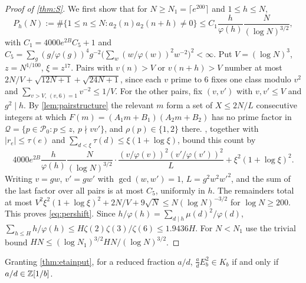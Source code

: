 \documentclass[11pt]{article}
\newcommand{\cnt}{\#}
\begin{document}
\begin{proof}[Proof of \cref{thm:S}]
We first show that for $N\ge N_1=\lceil e^{200}\rceil$ and $1\le h\le N$,
\begin{equation}\label{eq:pershift}
P_h(N):=\cnt\{1\le n\le N:a_2(n)a_2(n+h)\ne0\}\le C_1\frac h{\varphi(h)}\frac N{(\log N)^{3/2}},
\end{equation}
with $C_1=4000e^{2B}C_5+1$ and
$C_5=\sum_g(g/\varphi(g))^4g^{-2}\bigl(\sum_w(w/\varphi(w))^2w^{-2}\bigr)^2<\infty$. Put
$V=(\log N)^3$, $z=N^{1/100}$, $\xi=z^{17}$. Pairs with $v(n)>V$ or $v(n+h)>V$ number at most
$2N/V+\sqrt{12N+1}+\sqrt{24N+1}$, since each $v$ prime to $6$ fixes one class modulo $v^2$ and
$\sum_{v>V,\,(v,6)=1}v^{-2}\le1/V$. For the other pairs, fix $(v,v')$ with $v,v'\le V$ and $g^2\mid h$.
By \cref{lem:pairstructure} the relevant $m$ form a set of $X\le2N/L$ consecutive integers at which
$F(m)=(A_1m+B_1)(A_2m+B_2)$ has no prime factor in $\mathcal Q=\{p\in\mathcal P_0:p\le z,\ p\nmid vv'\}$,
and $\rho(p)\in\{1,2\}$ there. , together with
$|r_e|\le\tau(e)$ and $\sum_{d<\xi}\tau(d)\le\xi(1+\log\xi)$, bound this count by
\[
4000e^{2B}\frac h{\varphi(h)}\frac N{(\log N)^{3/2}}\cdot\frac{(v/\varphi(v))^2(v'/\varphi(v'))^2}L+\xi^2(1+\log\xi)^2 .
\]
Writing $v=gw$, $v'=gw'$ with $\gcd(w,w')=1$, $L=g^2w^2w'^2$, and the sum of the last factor over all
pairs is at most $C_5$, uniformly in $h$. The remainders total at most
$V^2\xi^2(1+\log\xi)^2+2N/V+9\sqrt N\le N(\log N)^{-3/2}$ for $\log N\ge200$. This proves
\eqref{eq:pershift}. Since $h/\varphi(h)=\sum_{d\mid h}\mu(d)^2/\varphi(d)$,
$\sum_{h\le H}h/\varphi(h)\le H\zeta(2)\zeta(3)/\zeta(6)\le1.9436H$. For $N<N_1$ use the trivial bound
$HN\le(\log N_1)^{3/2}HN/(\log N)^{3/2}$.
\end{proof}

\begin{theorem}\label{thm:squarescaling}
Granting \cref{thm:etainput}, for a reduced fraction $a/d$, $\frac adE_b^2\in K_b$ if and only if
$a/d\in\mathbb Z[1/b]$.
\end{theorem}
\end{document}
